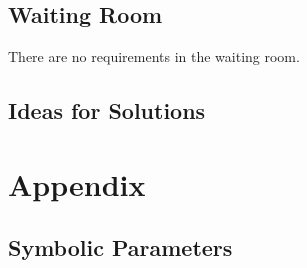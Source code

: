 \documentclass[12pt, titlepage]{article}
\begin{document}
\subsection{Waiting Room}
There are no requirements in the waiting room.

\subsection{Ideas for Solutions}





\newpage

\section{Appendix}

\subsection{Symbolic Parameters}
\end{document}
